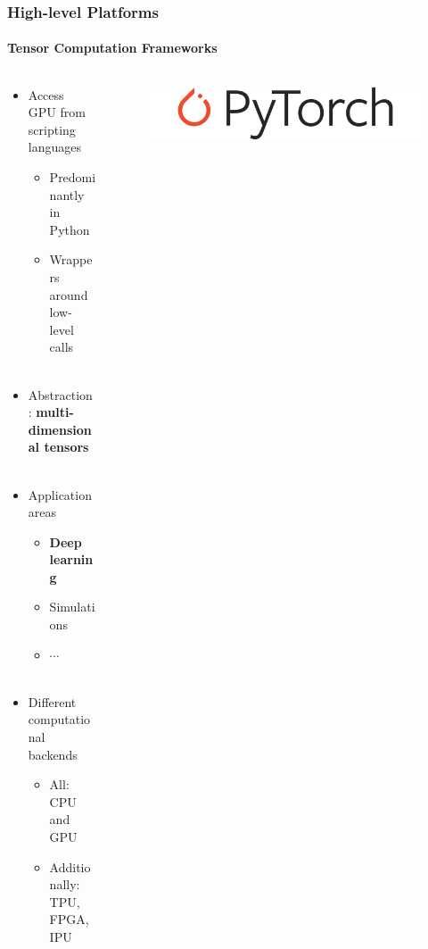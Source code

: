 \documentclass[aspectratio=1610]{beamer}
\begin{document}
\begin{frame}
    \frametitle{High-level Platforms}
    \framesubtitle{Tensor Computation Frameworks}
    
    \begin{columns}
        \begin{column}{0.58\textwidth}
            \begin{itemize}
                \item Access GPU from scripting languages
                \begin{itemize}
                    \item Predominantly in Python
                    \item Wrappers around low-level calls\\~
                \end{itemize}
                \item Abstraction: \textbf{multi-dimensional tensors}\\~
                \item Application areas
                \begin{itemize}
                    \item \textbf{Deep learning}
                    \item Simulations
                    \item $\cdots$\\~
                \end{itemize}
                \item Different computational backends
                \begin{itemize}
                    \item All: CPU and GPU
                    \item Additionally: TPU, FPGA, IPU
                \end{itemize}
            \end{itemize}
        \end{column}
        \begin{column}{0.38\textwidth}
            \begin{figure}
                \centering
                \includegraphics[width=0.8\linewidth]{images/pytorch.png}
                

\end{figure}
\end{column}
\end{columns}
\end{frame}
\end{document}
